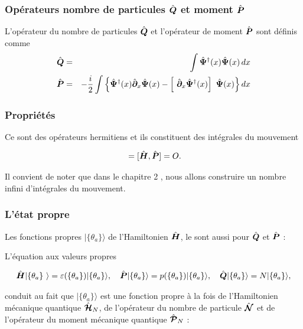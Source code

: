 \subsubsection{Opérateurs nombre de particules $\hat{\bm{Q}}$ et moment $\hat{\bm{P}}$}
L'opérateur du nombre de particules $\hat{\bm{Q}}$ et l'opérateur de moment $\hat{\bm{P}}$ sont définis comme 
\begin{eqnarray}
	\operator{Q} & = & \int \operator{\Psi}^\dag (x) \operator{\Psi} (x) \, d x \\
	\operator{P} & = & - \frac{i}2 \int \left \{  \operator{\Psi}^\dag(x) \operator{\partial}_x \operator{\Psi}(x) - \left [ \operator{\partial}_x \operator{\Psi}^\dag(x)\right ] \operator{\Psi}(x)\right \} dx \label{eq.1.7}
\end{eqnarray}

\subsubsection{Propriétés}

Ce sont des opérateurs hermitiens et ils constituent des intégrales du mouvement

\begin{eqnarray}
	[ \operator{H} , \operator{Q} ] = 	[ \operator{H} , \operator{P} ] = O. 
\end{eqnarray}

Il convient de noter que dans le chapitre 2 , nous allons construire un nombre infini d'intégrales du mouvement.

\subsubsection{L’état propre}

Les fonctions propres $\vert \{\theta_a\}\rangle$ de l'Hamiltonien $\hat{\bm{H}}$, le sont aussi pour $\hat{\bm{Q}}$ et $\hat{\bm{P}}$ :

L'équation aux valeurs propres 

\begin{eqnarray}
	\operator{H} \vert \{\theta_a\} \rangle = \varepsilon(\{\theta_a\}) \vert \{\theta_a\}\rangle, \quad \operator{P} \vert \{\theta_a\}\rangle = p(\{\theta_a\}) \vert \{\theta_a\}\rangle, \quad \operator{Q} \vert \{\theta_a\}\rangle = N \vert \{\theta_a\}\rangle,	
\end{eqnarray}

conduit au fait que $\vert \{\theta_a\} \rangle$ est une fonction propre à la fois de l'Hamiltonien mécanique quantique $\hat{\bm{\mathcal{H}}}_N$, de l'opérateur du nombre de particule $\hat{\bm{\mathcal{N}}}$ et de l'opérateur du moment mécanique quantique $\hat{\bm{\mathcal{P}}}_N$ :

